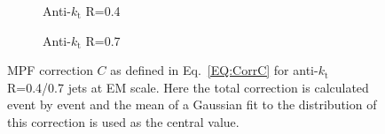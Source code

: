 \begin{figure}[!ht]
  \centering
  \begin{subfigure}{.5\textwidth}
    \centering
    \caption{Anti-$k_\mathrm{t}$ R=0.4}
  \end{subfigure}%
  \begin{subfigure}{.5\textwidth}  \centering
    \caption{Anti-$k_\mathrm{t}$ R=0.7}
  \end{subfigure}
  \caption[MPF Correction $C$ for anti-$k_\mathrm{t}$ R=0.4/0.7 jets]
  {\small MPF correction $C$ as defined in Eq.~\ref{EQ:CorrC} for anti-$k_\mathrm{t}$ R=0.4/0.7 jets at EM scale.  Here the total correction is calculated event by event and the mean of a Gaussian fit to the distribution of this correction is used as the central value.  }
  \label{Fig:TopoCorrSingle_4-7}
\end{figure}





